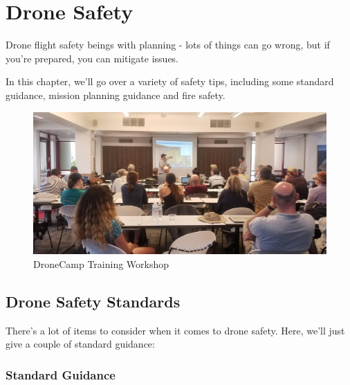 \documentclass[
  12pt,
]{book}
\begin{document}
\hypertarget{safety}{%
\chapter{Drone Safety}\label{safety}}

Drone flight safety beings with planning - lots of things can go wrong, but if you're prepared, you can mitigate issues.

In this chapter, we'll go over a variety of safety tips, including some standard guidance, mission planning guidance and fire safety.

\begin{figure}

{\centering \includegraphics[width=0.75\linewidth]{images/training_1} 

}

\caption{DroneCamp Training Workshop}\label{fig:training}
\end{figure}

\hypertarget{drone-safety-standards}{%
\section{Drone Safety Standards}\label{drone-safety-standards}}

There's a lot of items to consider when it comes to drone safety. Here, we'll just give a couple of standard guidance:

\hypertarget{standard-guidance}{%
\subsection{Standard Guidance}\label{standard-guidance}}
\end{document}
